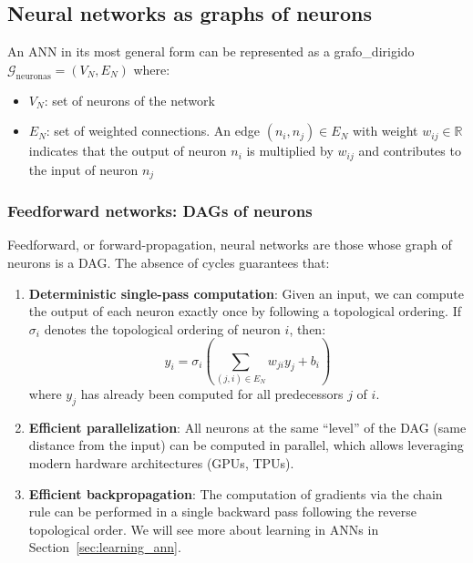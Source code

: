 \subsection{Neural networks as graphs of neurons}

An \gls{ANN} in its most general form can be represented as a \gls{grafo_dirigido} $\mathcal{G}_{\text{neuronas}} = (V_N, E_N)$ where:
\begin{itemize}
    \item $V_N$: set of neurons of the network
    \item $E_N$: set of weighted connections. An edge $(n_i, n_j) \in E_N$ with weight $w_{ij} \in \mathbb{R}$ indicates that the output of neuron $n_i$ is multiplied by $w_{ij}$ and contributes to the input of neuron $n_j$
\end{itemize}

\subsubsection[Feedforward networks: DAGs of neurons]{Feedforward networks: \glspl{DAG} of neurons}

Feedforward, or forward-propagation, neural networks are those whose graph of neurons is a \gls{DAG}. The absence of cycles guarantees that:

\begin{enumerate}
    \item \textbf{Deterministic single-pass computation}: Given an input, we can compute the output of each neuron exactly once by following a topological ordering. If $\sigma_i$ denotes the topological ordering of neuron $i$, then:
    \[
    y_i = \sigma_i\left(\sum_{(j,i) \in E_N} w_{ji} y_j + b_i\right)
    \]
    where $y_j$ has already been computed for all predecessors $j$ of $i$.

    \item \textbf{Efficient parallelization}: All neurons at the same ``level'' of the \gls{DAG} (same distance from the input) can be computed in parallel, which allows leveraging modern hardware architectures (GPUs, TPUs).

    \item \textbf{Efficient backpropagation}: The computation of gradients via the chain rule can be performed in a single backward pass following the reverse topological order. We will see more about learning in \glspl{ANN} in Section~\ref{sec:learning_ann}.
\end{enumerate}

